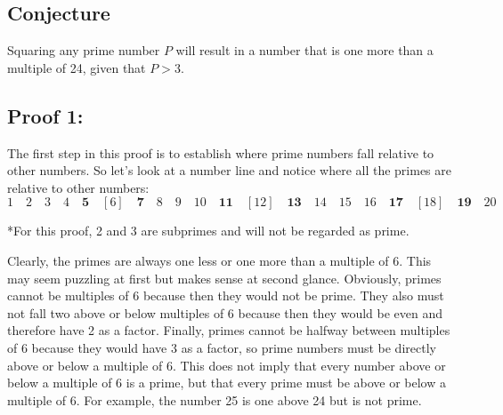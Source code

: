 
\subsection*{Conjecture}

Squaring any prime number \(P\) will result in a number that is one more than a multiple of 24, given that \(P > 3\).

\subsection*{Proof 1:}

The first step in this proof is to establish where prime numbers fall relative to other numbers. So let’s look at a number line and notice where all the primes are relative to other numbers:
\[1  \quad 2 \quad 3 \quad 4 \quad \textbf{5} \quad [6] \quad \textbf{7} \quad 8 \quad 9 \quad 10 \quad \textbf{11} \quad [12] \quad \textbf{13} \quad 14 \quad 15 \quad 16 \quad \textbf{17} \quad [18] \quad \textbf{19} \quad 20\]

*For this proof, 2 and 3 are subprimes and will not be regarded as prime.

Clearly, the primes are always one less or one more than a multiple of 6. This may seem puzzling at first but makes sense at second glance. Obviously, primes cannot be multiples of 6 because then they would not be prime. They also must not fall two above or below multiples of 6 because then they would be even and therefore have 2 as a factor. Finally, primes cannot be halfway between multiples of 6 because they would have 3 as a factor, so prime numbers must be directly above or below a multiple of 6. This does not imply that every number above or below a multiple of 6 is a prime, but that every prime must be above or below a multiple of 6. For example, the number 25 is one above 24 but is not prime. 

